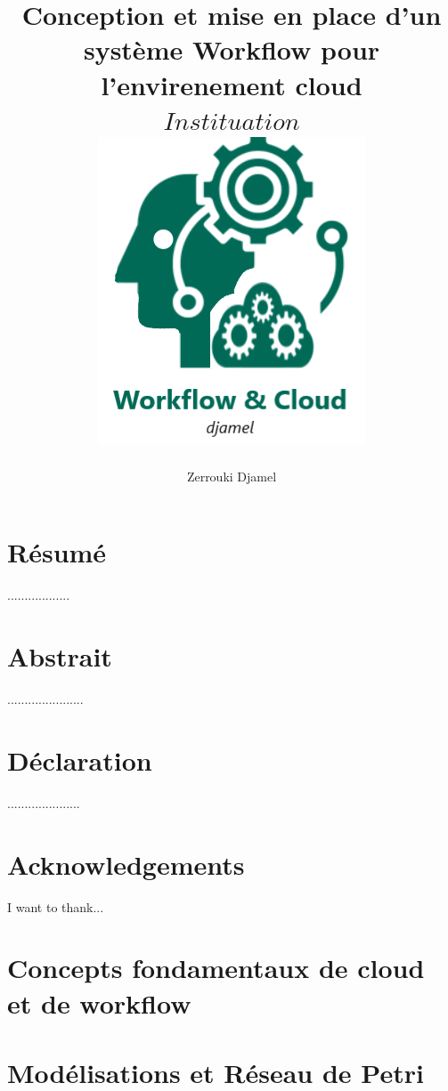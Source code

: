 \documentclass[12pt,twoside]{report}
\title{
	{\textbf{Conception et mise en place d’un système Workflow  pour l’envirenement cloud}} \\   
	{$ Instituation $}\\
	{\includegraphics{logof.PNG}}
}
\author{Zerrouki Djamel}
\begin{document}
\maketitle
 
\chapter*{Résumé}
..................

\chapter*{Abstrait}
......................

\chapter*{Déclaration}
.....................

\chapter*{Acknowledgements}
I want to thank...
\listoffigures

\listoftables

\tableofcontents


\chapter{Concepts fondamentaux de cloud et de workflow }


\chapter{Modélisations et Réseau de Petri}


%
 

 \printbibliography
\end{document}
